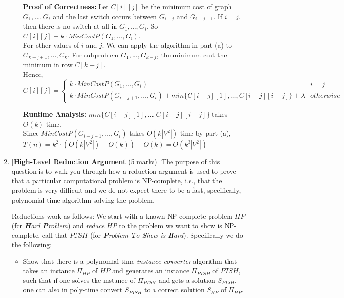 \documentclass[11pt]{article}
\begin{document}
\begin{enumerate}
\begin{enumerate}
    \textbf{Proof of Correctness:} Let $C[i][j]$ be the minimum cost of graph $G_1, \dots, G_i$ and the last 
    switch occurs between $G_{i - j}$ and $G_{i - j + 1}$. If $i = j$, then there is no switch at all in 
    $G_1, \dots, G_i$. So $C[i][j] = k \cdot MinCostP(G_{1}, \dots, G_i)$.\\
    For other values of $i$ and $j$. We can apply the algorithm in 
    part (a) to $G_{k - j + 1}, \dots, G_k$. For subproblem $G_1, \dots, G_{k-j}$, the minimum cost the 
    minimum in row $C[k - j]$. \\
    Hence,\\
    \[ C[i][j] = \begin{cases} 
        k \cdot MinCostP(G_{1}, \dots, G_i) & i = j \\
        k \cdot MinCostP(G_{i - j + 1}, \dots, G_i) + min\{C[i - j][1], \dots, C[i - j][i - j]\} + \lambda & otherwise
     \end{cases}
    \]

    \textbf{Runtime Analysis:} $min\{C[i - j][1], \dots, C[i - j][i - j]\}$ takes $O(k)$ time.\\
    Since $MinCostP(G_{i - j + 1}, \dots, G_i)$ takes $O(k|V^2|)$ time by part (a), \\
    $T(n) = k^2 \cdot (O(k|V^2|) + O(k)) + O(k) = O(k^3|V^2|)$
\end{enumerate}

\newpage
\item{[{\bf High-Level Reduction Argument} (5 marks)]}
The purpose of this question is to walk you through how a reduction argument is used to prove that a particular computational problem is NP-complete, i.e., that the problem is very difficult and we do not expect there to be a fast, specifically, polynomial time algorithm solving the problem. 

Reductions work as follows: We start with a known NP-complete problem $HP$ (for {\em {\bf H}ard {\bf P}roblem}) and {\em reduce} $HP$ to the problem we want to show is NP-complete, call that $PTSH$ (for {\em {\bf P}roblem {\bf T}o {\bf S}how is {\bf H}ard}). Specifically we do the following:

\begin{itemize}
\item Show that there is a polynomial time {\em instance converter} algorithm that takes an instance $\Pi_{HP}$ of $HP$ and generates an instance $\Pi_{PTSH}$ of $PTSH$, such that if one solves the instance of $\Pi_{PTSH}$ and gets a solution $S_{PTSH}$, one can also in poly-time convert $S_{PTSH}$ to a correct solution $S_{HP}$ of $\Pi_{HP}$.  
\end{itemize}


\end{enumerate}
\end{document}
